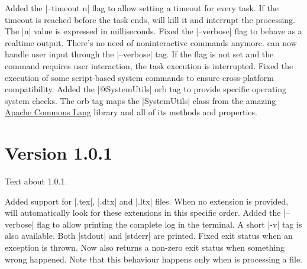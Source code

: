 \documentclass[a4paper,twoside,12pt]{memoir}
\begin{document}
\begin{changelog}\small
\newfeature Added the |--timeout n| flag to allow setting a timeout for every task. If the timeout is reached before the task ends, \arara will kill it and interrupt the processing. The |n| value is expressed in milliseconds.
\bugfix Fixed the |--verbose| flag to behave as a realtime output.
\newfeature There's no need of noninteractive commands anymore. \arara can now handle user input through the |--verbose| tag. If the flag is not set and the command requires user interaction, the task execution is interrupted.
\bugfix Fixed the execution of some script-based system commands to ensure cross-platform compatibility.
\newfeature Added the |@{SystemUtils}| orb tag to provide specific operating system checks. The orb tag maps the |SystemUtils| class from the amazing \href{http://commons.apache.org/lang/}{Apache Commons Lang} library and all of its methods and properties.
\end{changelog}

%
%

\section*{Version 1.0.1}

Text about 1.0.1.

\begin{changelog}\small
\newfeature Added support for |.tex|, |.dtx| and |.ltx| files. When no extension is provided, \arara will automatically look for these extensions in this specific order.
\newfeature Added the |--verbose| flag to allow printing the complete log in the terminal. A short |-v| tag is also available. Both |stdout| and |stderr| are printed.
\bugfix Fixed exit status when an exception is thrown. Now \arara also returns a non-zero exit status when something wrong happened. Note that this behaviour happens only when \arara is processing a file.
\end{changelog}
\end{document}
